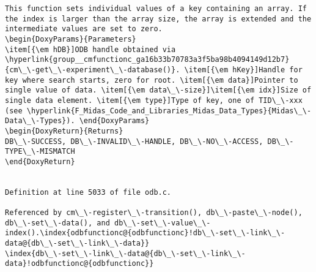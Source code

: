 \begin{DoxyItemize}
\begin{DoxyCode}
\begin{verbatim}
This function sets individual values of a key containing an array. If the index is larger than the array size, the array is extended and the intermediate values are set to zero. 
\begin{DoxyParams}{Parameters}
\item[{\em hDB}]ODB handle obtained via \hyperlink{group__cmfunctionc_ga16b33b70783a3f5ba98b4094149d12b7}{cm\_\-get\_\-experiment\_\-database()}. \item[{\em hKey}]Handle for key where search starts, zero for root. \item[{\em data}]Pointer to single value of data. \item[{\em data\_\-size}]\item[{\em idx}]Size of single data element. \item[{\em type}]Type of key, one of TID\_\-xxx (see \hyperlink{F_Midas_Code_and_Libraries_Midas_Data_Types}{Midas\_\-Data\_\-Types}). \end{DoxyParams}
\begin{DoxyReturn}{Returns}
DB\_\-SUCCESS, DB\_\-INVALID\_\-HANDLE, DB\_\-NO\_\-ACCESS, DB\_\-TYPE\_\-MISMATCH 
\end{DoxyReturn}


Definition at line 5033 of file odb.c.

Referenced by cm\_\-register\_\-transition(), db\_\-paste\_\-node(), db\_\-set\_\-data(), and db\_\-set\_\-value\_\-index().\index{odbfunctionc@{odbfunctionc}!db\_\-set\_\-link\_\-data@{db\_\-set\_\-link\_\-data}}
\index{db\_\-set\_\-link\_\-data@{db\_\-set\_\-link\_\-data}!odbfunctionc@{odbfunctionc}}

\end{verbatim}
\end{DoxyCode}
\end{DoxyItemize}
